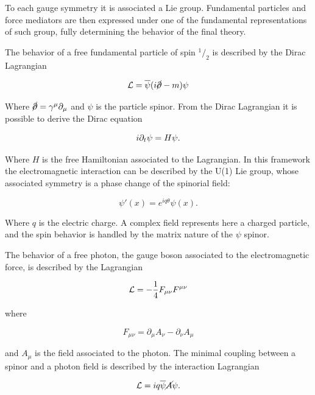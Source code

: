 To each gauge symmetry it is associated a Lie group. Fundamental particles and force mediators are then expressed under one of the fundamental representations of such group, fully determining the behavior of the final theory.

The behavior of a free fundamental particle of spin $^1/_2$ is described by the Dirac Lagrangian

\begin{equation}
\mathcal{L}=\overline{\psi}(i\cancel{\partial}-m)\psi
\label{eq:dirac_lag}
\end{equation}

Where $\cancel{\partial} = \gamma^\mu \partial_\mu$ and $\psi$ is the particle spinor.%
From the Dirac Lagrangian it is possible to derive the Dirac equation

\begin{equation}
i \partial_t\psi = H \psi.
\label{eq:dirac_lag}
\end{equation}

Where $H$ is the free Hamiltonian associated to the Lagrangian.
In this framework the electromagnetic interaction can be described by the U(1) Lie group, whose associated symmetry is a phase change of the spinorial field: %

\begin{equation}
\psi'(x) = e^{iq\theta}\psi(x).
\end{equation}

Where $q$ is the electric charge.
A complex field represents here a charged particle, and the spin behavior is handled by the matrix nature of the $\psi$ spinor.

The behavior of a free photon, the gauge boson associated to the electromagnetic force, is described by the Lagrangian

\begin{equation}
\mathcal{L} = -\frac{1}{4}F_{\mu\nu}F^{\mu\nu}
\end{equation}

where

\begin{equation}
 F_{\mu\nu} =\partial_{\mu}A_{\nu}-\partial_{\nu}A_{\mu}
\end{equation}

and $A_{\mu}$ is the field associated to the photon.
The minimal coupling between a spinor and a photon field is described by the interaction Lagrangian

\begin{equation}
\mathcal{L} = iq \overline{\psi} \cancel{A} \psi.
\end{equation}

